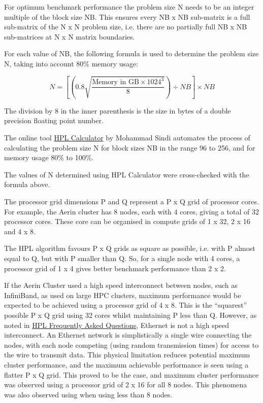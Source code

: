 \documentclass{report}
\begin{document}
For optimum benchmark performance the problem size N needs to be an integer multiple of the block size NB. This ensures every NB x NB sub-matrix is a full sub-matrix of the N x N problem size, i.e. there are no partially full NB x NB sub-matrices at N x N matrix boundaries.

For each value of NB, the following formula is used to determine the problem size N, taking into account 80\% memory usage:

\[N = \left[\left(0.8 \sqrt{\frac{\text{Memory in GB} \times 1024^3}{8}}\right) \div NB\right] \times NB\]

The division by 8 in the inner parenthesis is the size in bytes of a double precision floating point number.


The online tool \href{http://hpl-calculator.sourceforge.net}{HPL Calculator} by Mohammad Sindi automates the process of calculating the problem size N for block sizes NB in the range 96 to 256, and for memory usage 80\% to 100\%.

The values of N determined using HPL Calculator were cross-checked with the formula above.

The processor grid dimensions P and Q represent a P x Q grid of processor cores. For example, the Aerin cluster has 8 nodes, each with 4 cores, giving a total of 32 processor cores. These core can be organised in compute grids of 1 x 32, 2 x 16 and 4 x 8.

The HPL algorithm favours P x Q grids as square as possible, i.e. with P almost equal to Q, but with P smaller than Q. So, for a single node with 4 cores, a processor grid of 1 x 4 gives better benchmark performance than 2 x 2.

If the Aerin Cluster used a high speed interconnect between nodes, such as InfiniBand, as used on large HPC clusters, maximum performance would be expected to be achieved using a processor grid of 4 x 8. This is the ``squarest'' possible P x Q grid using 32 cores whilst maintaining P less than Q. However, as noted in \href{https://www.netlib.org/benchmark/hpl/faqs.html}{HPL Frequently Asked Questions}, Ethernet is not a high speed interconnect. An Ethernet network is simplistically a single wire connecting the nodes, with each node competing (using random transmission times) for access to the wire to transmit data. This physical limitation reduces potential maximum cluster performance, and the maximum achievable performance is seen using a flatter P x Q grid. This proved to be the case, and maximum cluster performance was observed using a processor grid of 2 x 16 for all 8 nodes. This phenomena was also observed using when using less than 8 nodes.
\end{document}
